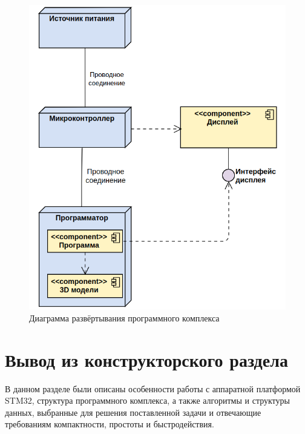 \begin{figure}[h]
	\centering
	\includegraphics[scale=0.777 ]{img/deploy_diagram/dd1.png}
	\caption{Диаграмма развёртывания программного комплекса}
	\label{fig:deploy_diagram}
\end{figure} 

\section{Вывод из конструкторского раздела}
В данном разделе были описаны особенности работы с аппаратной платформой STM32, структура программного комплекса, а также алгоритмы и 
структуры данных, выбранные для решения поставленной задачи и отвечающие требованиям компактности, простоты и быстродействия.



